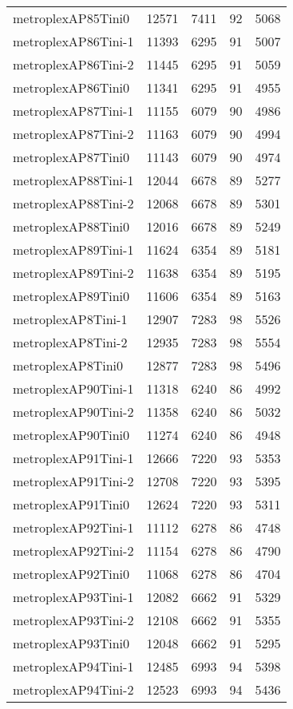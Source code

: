 \begin{longtable}{lrrrr}
metroplexAP85Tini0 & 12571 & 7411 & 92 & 5068 \\
metroplexAP86Tini-1 & 11393 & 6295 & 91 & 5007 \\
metroplexAP86Tini-2 & 11445 & 6295 & 91 & 5059 \\
metroplexAP86Tini0 & 11341 & 6295 & 91 & 4955 \\
metroplexAP87Tini-1 & 11155 & 6079 & 90 & 4986 \\
metroplexAP87Tini-2 & 11163 & 6079 & 90 & 4994 \\
metroplexAP87Tini0 & 11143 & 6079 & 90 & 4974 \\
metroplexAP88Tini-1 & 12044 & 6678 & 89 & 5277 \\
metroplexAP88Tini-2 & 12068 & 6678 & 89 & 5301 \\
metroplexAP88Tini0 & 12016 & 6678 & 89 & 5249 \\
metroplexAP89Tini-1 & 11624 & 6354 & 89 & 5181 \\
metroplexAP89Tini-2 & 11638 & 6354 & 89 & 5195 \\
metroplexAP89Tini0 & 11606 & 6354 & 89 & 5163 \\
metroplexAP8Tini-1 & 12907 & 7283 & 98 & 5526 \\
metroplexAP8Tini-2 & 12935 & 7283 & 98 & 5554 \\
metroplexAP8Tini0 & 12877 & 7283 & 98 & 5496 \\
metroplexAP90Tini-1 & 11318 & 6240 & 86 & 4992 \\
metroplexAP90Tini-2 & 11358 & 6240 & 86 & 5032 \\
metroplexAP90Tini0 & 11274 & 6240 & 86 & 4948 \\
metroplexAP91Tini-1 & 12666 & 7220 & 93 & 5353 \\
metroplexAP91Tini-2 & 12708 & 7220 & 93 & 5395 \\
metroplexAP91Tini0 & 12624 & 7220 & 93 & 5311 \\
metroplexAP92Tini-1 & 11112 & 6278 & 86 & 4748 \\
metroplexAP92Tini-2 & 11154 & 6278 & 86 & 4790 \\
metroplexAP92Tini0 & 11068 & 6278 & 86 & 4704 \\
metroplexAP93Tini-1 & 12082 & 6662 & 91 & 5329 \\
metroplexAP93Tini-2 & 12108 & 6662 & 91 & 5355 \\
metroplexAP93Tini0 & 12048 & 6662 & 91 & 5295 \\
metroplexAP94Tini-1 & 12485 & 6993 & 94 & 5398 \\
metroplexAP94Tini-2 & 12523 & 6993 & 94 & 5436 \\

\end{longtable}
